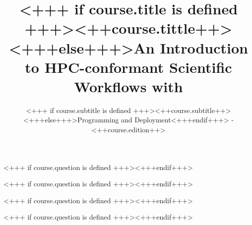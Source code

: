 \documentclass[english,xcolor=pdftex,dvipsnames,aspectratio=<+++ if course.aspectratio is defined +++><++course.aspectratio++><+++else+++>43<+++endif+++>]{beamer}
\title[<++course.shorttitle++>]{<+++ if course.title is defined +++><++course.tittle++><+++else+++>An Introduction to HPC-conformant Scientific Workflows with \Snakemake<+++endif+++>}
\subtitle{<+++ if course.subtitle is defined +++><++course.subtitle++><+++else+++>Programming and Deployment<+++endif+++> - <++course.edition++>}
\begin{document}

\sloppy

\begin{frame}[plain] %
  \titlepage
\end{frame}












<+++ if course.question is defined +++><+++endif+++>




<+++ if course.question is defined +++><+++endif+++>


<+++ if course.question is defined +++><+++endif+++>




<+++ if course.question is defined +++><+++endif+++>
\end{document}
